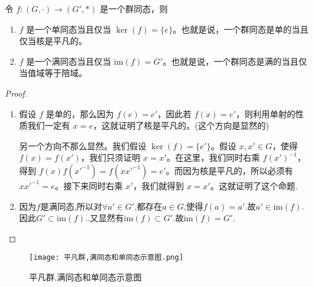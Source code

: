 \documentclass[../../main.tex]{subfiles}
\begin{document}
\begin{proposition}\label{proposition:一个群同态是单的当且仅当核是平凡的}
令 $f:(G,\cdot)\to (G',*)$ 是一个群同态，则
\begin{enumerate}
\item $f$ 是一个单同态当且仅当 $\ker(f)=\{e\}$。也就是说，一个群同态是单的当且仅当核是平凡的。

\item $f$ 是一个满同态当且仅当 $ \mathrm{im}(f)=G'$。也就是说，一个群同态是满的当且仅当值域等于陪域。
\end{enumerate}
\end{proposition}
\begin{proof}
\begin{enumerate}
\item 假设 $f$ 是单的，那么因为 $f(e)=e'$，因此若 $f(x)=e'$，则利用单射的性质我们一定有 $x = e$，这就证明了核是平凡的。(这个方向是显然的)

另一个方向不那么显然。我们假设 $\ker(f)=\{e'\}$。假设 $x,x'\in G$，使得 $f(x)=f(x')$，我们只须证明 $x = x'$。在这里，我们同时右乘 $f(x')^{-1}$，得到 $f(x)f(x'^{-1})=f(xx'^{-1})=e'$。而因为核是平凡的，所以必须有 $xx'^{-1}=e$。接下来同时右乘 $x'$，我们就得到 $x = x'$。这就证明了这个命题.

\item 因为$f$是满同态,所以对$\forall a'\in G'$,都存在$a\in G$,使得$f(a)=a'.$故$a'\in \mathrm{im}(f)$.因此$G' \subset \mathrm{im}(f).$.又显然有$\mathrm{im}(f) \subset G'.$故$\mathrm{im}(f) = G'.$
\end{enumerate}

\end{proof}

\begin{figure}[H]
\centering
\texttt{[image: 平凡群,满同态和单同态示意图.png]}
\label{figure:平凡群,满同态和单同态示意图}
\caption{平凡群,满同态和单同态示意图}
\end{figure}
\end{document}
